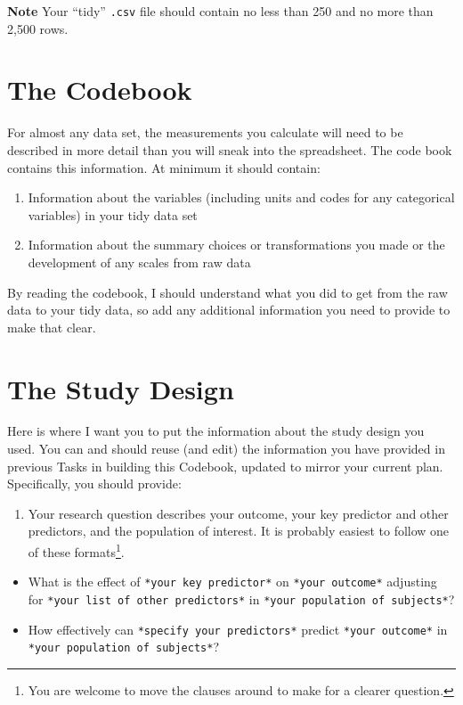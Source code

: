 \documentclass[]{book}
\providecommand{\tightlist}{%
  \setlength{\itemsep}{0pt}\setlength{\parskip}{0pt}}
\let\rmarkdownfootnote\footnote%
\def\footnote{\protect\rmarkdownfootnote}
\begin{document}
\textbf{Note} Your ``tidy'' \texttt{.csv} file should contain no less than 250 and no more than 2,500 rows.

\hypertarget{the-codebook}{%
\section{The Codebook}\label{the-codebook}}

For almost any data set, the measurements you calculate will need to be described in more detail than you will sneak into the spreadsheet. The code book contains this information. At minimum it should contain:

\begin{enumerate}
\def\labelenumi{\arabic{enumi}.}
\tightlist
\item
  Information about the variables (including units and codes for any categorical variables) in your tidy data set
\item
  Information about the summary choices or transformations you made or the development of any scales from raw data
\end{enumerate}

By reading the codebook, I should understand what you did to get from the raw data to your tidy data, so add any additional information you need to provide to make that clear.

\hypertarget{the-study-design}{%
\section{The Study Design}\label{the-study-design}}

Here is where I want you to put the information about the study design you used. You can and should reuse (and edit) the information you have provided in previous Tasks in building this Codebook, updated to mirror your current plan. Specifically, you should provide:

\begin{enumerate}
\def\labelenumi{\arabic{enumi}.}
\tightlist
\item
  Your research question describes your outcome, your key predictor and other predictors, and the population of interest. It is probably easiest to follow one of these formats\footnote{You are welcome to move the clauses around to make for a clearer question.}.
\end{enumerate}

\begin{itemize}
\tightlist
\item
  What is the effect of \texttt{*your\ key\ predictor*} on \texttt{*your\ outcome*} adjusting for \texttt{*your\ list\ of\ other\ predictors*} in \texttt{*your\ population\ of\ subjects*}?
\item
  How effectively can \texttt{*specify\ your\ predictors*} predict \texttt{*your\ outcome*} in \texttt{*your\ population\ of\ subjects*}?
\end{itemize}
\end{document}

